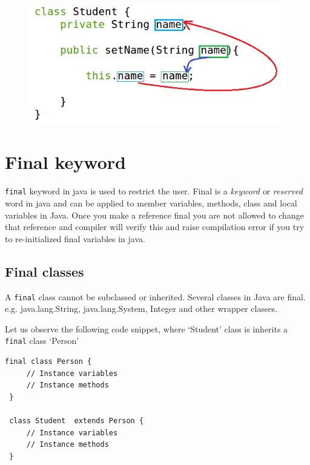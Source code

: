 \documentclass[11pt,a4paper]{article}
\begin{document}
\begin{description}
\begin{itemize}
   \begin{figure}[H] 
 \begin{center}
 \includegraphics[scale=.7]{this-demo.png}
 \end{center}
 \end{figure}
 \end{itemize}
\end{description}

\section*{Final keyword}
\lstinline!final! keyword in java is used to restrict the user. Final is a \emph{keyword} or \emph{reserved} word in java and can be applied to member variables, methods, class and local variables in Java. 
 Once you make a reference final you are not allowed to change that reference and compiler will verify this and raise compilation error if you try to re-initialized final variables in java.

\subsection*{Final classes}
A \lstinline!final! class cannot be subclassed or inherited. Several classes in Java are final. e.g. java.lang.String, java.lang.System, Integer and other wrapper classes.
 
Let us observe the following code snippet, where `Student' class is inherits a \lstinline!final! class `Person'
 \begin{lstlisting}[numbers=none]
 final class Person {
     // Instance variables
     // Instance methods
 }

 class Student  extends Person {  
     // Instance variables
     // Instance methods
 }
 \end{lstlisting}
 
\end{document}
